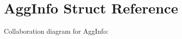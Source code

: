 \hypertarget{structAggInfo}{}\section{Agg\+Info Struct Reference}
\label{structAggInfo}


Collaboration diagram for Agg\+Info\+:
